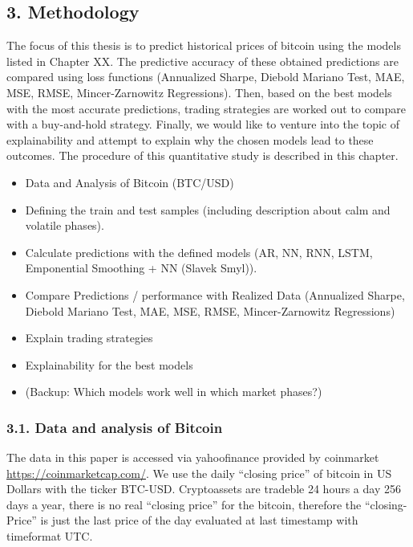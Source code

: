 \documentclass[
]{article}
\providecommand{\tightlist}{%
  \setlength{\itemsep}{0pt}\setlength{\parskip}{0pt}}
\begin{document}
\newpage

\hypertarget{methodology}{%
\subsection{3. Methodology}\label{methodology}}

The focus of this thesis is to predict historical prices of bitcoin
using the models listed in Chapter XX. The predictive accuracy of these
obtained predictions are compared using loss functions (Annualized
Sharpe, Diebold Mariano Test, MAE, MSE, RMSE, Mincer-Zarnowitz
Regressions). Then, based on the best models with the most accurate
predictions, trading strategies are worked out to compare with a
buy-and-hold strategy. Finally, we would like to venture into the topic
of explainability and attempt to explain why the chosen models lead to
these outcomes. The procedure of this quantitative study is described in
this chapter.

\begin{itemize}
\tightlist
\item
  Data and Analysis of Bitcoin (BTC/USD)
\item
  Defining the train and test samples (including description about calm
  and volatile phases).
\item
  Calculate predictions with the defined models (AR, NN, RNN, LSTM,
  Emponential Smoothing + NN (Slavek Smyl)).
\item
  Compare Predictions / performance with Realized Data (Annualized
  Sharpe, Diebold Mariano Test, MAE, MSE, RMSE, Mincer-Zarnowitz
  Regressions)
\item
  Explain trading strategies
\item
  Explainability for the best models
\item
  (Backup: Which models work well in which market phases?)
\end{itemize}

\hypertarget{data-and-analysis-of-bitcoin}{%
\subsubsection{3.1. Data and analysis of
Bitcoin}\label{data-and-analysis-of-bitcoin}}

The data in this paper is accessed via yahoofinance provided by
coinmarket \url{https://coinmarketcap.com/}. We use the daily ``closing
price'' of bitcoin in US Dollars with the ticker BTC-USD. Cryptoassets
are tradeble 24 hours a day 256 days a year, there is no real ``closing
price'' for the bitcoin, therefore the ``closing-Price'' is just the
last price of the day evaluated at last timestamp with timeformat UTC.
\end{document}
